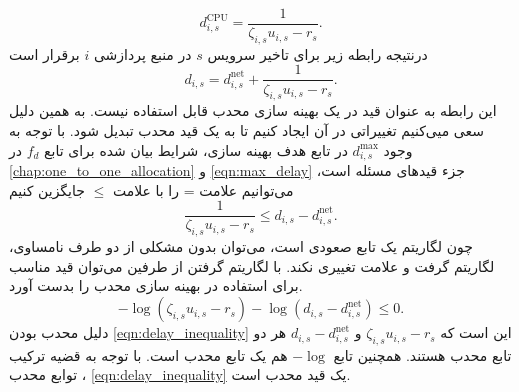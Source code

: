     \begin{equation}
      d_{i,s}^\text{CPU} = \frac{1}{\zeta_{i,s} u_{i,s} - r_s}.
    \end{equation}
    درنتیجه رابطه زیر برای تاخیر سرویس $s$ در منبع پردازشی $i$ برقرار است
    \begin{equation}
      d_{i,s} = d_{i,s}^\text{net} + \frac{1}{\zeta_{i,s} u_{i,s} - r_s}.
    \end{equation}
    این رابطه به عنوان قید در یک بهینه سازی محدب قابل استفاده نیست.
    به همین دلیل سعی میی‌کنیم تغییراتی در آن ایجاد کنیم تا به یک قید محدب تبدیل شود.
    با توجه به وجود $d_{i,s}^\text{max}$ در تابع هدف بهینه سازی، شرایط بیان شده برای تابع $f_d$ در \cref{chap:one_to_one_allocation} و \cref{eqn:max_delay} جزء قید‌های مسئله است، می‌توانیم علامت = را با علامت $\le$ جایگزین کنیم
    \begin{equation}
      \frac{1}{\zeta_{i,s} u_{i,s} - r_s} \le d_{i,s} - d_{i,s}^\text{net}.
    \end{equation}
    چون لگاریتم یک تابع صعودی است، می‌توان بدون مشکلی از دو طرف نامساوی، لگاریتم گرفت و علامت تغییری نکند.
    با لگاریتم گرفتن از طرفین می‌توان قید مناسب برای استفاده در بهینه سازی محدب را بدست آورد.
    \begin{equation}\label{eqn:delay_inequality}
      - \log (\zeta_{i,s} u_{i,s} - r_s) - \log (d_{i,s} - d_{i,s}^\text{net}) \le 0.
    \end{equation}
    دلیل محدب بودن \cref{eqn:delay_inequality} این است که $\zeta_{i,s} u_{i,s} - r_s$ و $d_{i,s} - d_{i,s}^\text{net}$ هر دو تابع محدب هستند.
    همچنین تابع $-\log$ هم یک تابع محدب است.
    با توجه به قضیه ترکیب توابع محدب \cite{boyd2004convex}، \cref{eqn:delay_inequality} یک قید محدب است.

